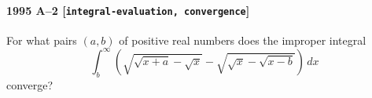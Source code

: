 \paragraph{1995 A--2 \textnormal{[\texttt{integral-evaluation, convergence}]}}
For what pairs $(a,b)$ of positive real numbers does the
improper integral
\[
\int_{b}^{\infty} \left( \sqrt{\sqrt{x+a}-\sqrt{x}} -
\sqrt{\sqrt{x}-\sqrt{x-b}} \right)\,dx
\]
converge?
